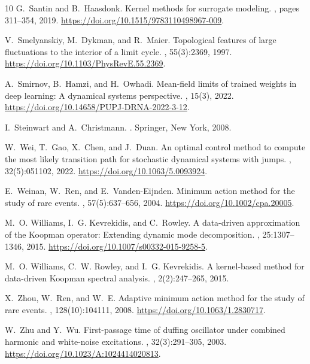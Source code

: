 \begin{thebibliography}{10}
G.~Santin and B.~Haasdonk.
\newblock Kernel methods for surrogate modeling.
, pages 311--354,
  2019.
\newblock \url{https://doi.org/10.1515/9783110498967-009}.

V.~Smelyanskiy, M.~Dykman, and R.~Maier.
\newblock Topological features of large fluctuations to the interior of a limit
  cycle.
, 55(3):2369, 1997.
\newblock \url{https://doi.org/10.1103/PhysRevE.55.2369}.

A.~Smirnov, B.~Hamzi, and H.~Owhadi.
\newblock Mean-field limits of trained weights in deep learning: A dynamical
  systems perspective.
, 15(3), 2022.
\newblock \url{https://doi.org/10.14658/PUPJ-DRNA-2022-3-12}.

I.~Steinwart and A.~Christmann.
.
\newblock Springer, New York, 2008.

W.~Wei, T.~Gao, X.~Chen, and J.~Duan.
\newblock An optimal control method to compute the most likely transition path
  for stochastic dynamical systems with jumps.
, 32(5):051102, 2022.
\newblock \url{https://doi.org/10.1063/5.0093924}.

E.~Weinan, W.~Ren, and E.~Vanden-Eijnden.
\newblock Minimum action method for the study of rare events.
, 57(5):637--656,
  2004.
\newblock \url{https://doi.org/10.1002/cpa.20005}.

M.~O. Williams, I.~G. Kevrekidis, and C.~Rowley.
\newblock A data-driven approximation of the {K}oopman operator: Extending
  dynamic mode decomposition.
, 25:1307--1346, 2015.
\newblock \url{https://doi.org/10.1007/s00332-015-9258-5}.

\begingroup\color{blue}
M.~O. Williams, C.~W. Rowley, and I.~G. Kevrekidis.
\newblock A kernel-based method for data-driven {Koopman} spectral analysis.
, 2(2):247--265, 2015.
\par\endgroup

X.~Zhou, W.~Ren, and W.~E.
\newblock Adaptive minimum action method for the study of rare events.
, 128(10):104111, 2008.
\newblock \url{https://doi.org/10.1063/1.2830717}.

W.~Zhu and Y.~Wu.
\newblock First-passage time of duffing oscillator under combined harmonic and
  white-noise excitations.
, 32(3):291--305, 2003.
\newblock \url{https://doi.org/10.1023/A:1024414020813}.

\end{thebibliography}
